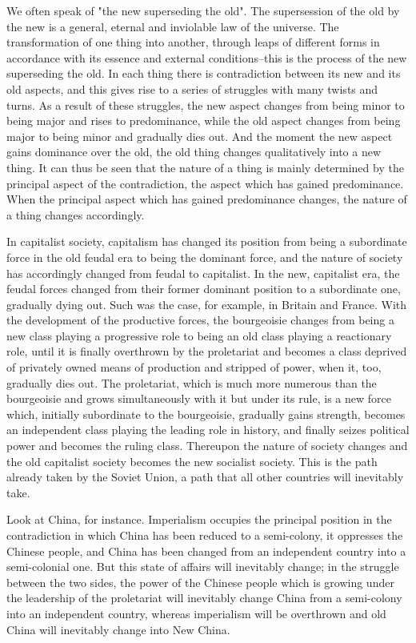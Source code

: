 \documentclass{article}
\begin{document}
We often speak of "the new superseding the old". The supersession of the old by
the new is a general, eternal and inviolable law of the universe. The
transformation of one thing into another, through leaps of different forms in
accordance with its essence and external conditions--this is the process of the
new superseding the old. In each thing there is contradiction between its new
and its old aspects, and this gives rise to a series of struggles with many
twists and turns. As a result of these struggles, the new aspect changes from
being minor to being major and rises to predominance, while the old aspect
changes from being major to being minor and gradually dies out. And the moment
the new aspect gains dominance over the old, the old thing changes
qualitatively into a new thing. It can thus be seen that the nature of a thing
is mainly determined by the principal aspect of the contradiction, the aspect
which has gained predominance. When the principal aspect which has gained
predominance changes, the nature of a thing changes accordingly.

In capitalist society, capitalism has changed its position from being
a subordinate force in the old feudal era to being the dominant force, and the
nature of society has accordingly changed from feudal to capitalist. In the
new, capitalist era, the feudal forces changed from their former dominant
position to a subordinate one, gradually dying out. Such was the case, for
example, in Britain and France. With the development of the productive forces,
the bourgeoisie changes from being a new class playing a progressive role to
being an old class playing a reactionary role, until it is finally overthrown
by the proletariat and becomes a class deprived of privately owned means of
production and stripped of power, when it, too, gradually dies out. The
proletariat, which is much more numerous than the bourgeoisie and grows
simultaneously with it but under its rule, is a new force which, initially
subordinate to the bourgeoisie, gradually gains strength, becomes an
independent class playing the leading role in history, and finally seizes
political power and becomes the ruling class. Thereupon the nature of society
changes and the old capitalist society becomes the new socialist society. This
is the path already taken by the Soviet Union, a path that all other countries
will inevitably take.

Look at China, for instance. Imperialism occupies the principal position in the
contradiction in which China has been reduced to a semi-colony, it oppresses
the Chinese people, and China has been changed from an independent country into
a semi-colonial one. But this state of affairs will inevitably change; in the
struggle between the two sides, the power of the Chinese people which is
growing under the leadership of the proletariat will inevitably change China
from a semi-colony into an independent country, whereas imperialism will be
overthrown and old China will inevitably change into New China.
\end{document}
